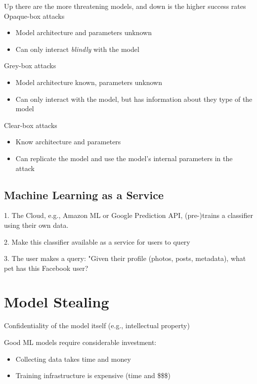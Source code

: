 \documentclass[11pt]{article}
\begin{document}
Up there are the more threatening models, and down is the higher success rates
Opaque-box attacks
\begin{itemize}
	\item Model architecture and parameters unknown
	\item Can only interact \textit{blindly} with the model
\end{itemize}

Grey-box attacks
\begin{itemize}
	\item Model architecture known, parameters unknown
	\item Can only interact with the model, but has information about they type of the model
\end{itemize}

Clear-box attacks
\begin{itemize}
	\item Know architecture and parameters
	\item Can replicate the model and use the model's internal parameters in the attack
\end{itemize}

\subsection*{Machine Learning as a Service}

1. The Cloud, e.g., Amazon ML or Google Prediction API, (pre-)trains a classifier using their own data.

2. Make this classifier available as a service for users to query

3. The user makes a query: "Given their profile (photos, posts, metadata), what pet has this Facebook user?

\vspace{0.5cm}

\section*{Model Stealing}


Confidentiality of the model itself (e.g., intellectual property)

Good ML models require considerable investment:
\begin{itemize}
	\item Collecting data takes time and money
	\item Training infrastructure is expensive (time and \$\$\$)
\end{itemize}
\end{document}
